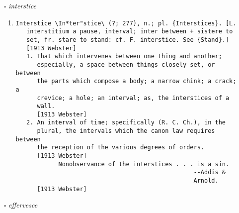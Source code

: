 \documentclass{article}
\begin{document}
\begin{itemize}
\begin{enumerate}
\item{
\begin{lstlisting}
Sardonic \Sar*don"ic\, a.
   Of, pertaining to, or resembling, a kind of linen made at
   Colchis.
   [1913 Webster]
Sardonic \Sar*don"ic\, a. [F. sardonique, L. sardonius, Gr. ?,
   ?, perhaps fr. ? to grin like a dog, or from a certain plant
   of Sardinia, Gr. ?, which was said to screw up the face of
   the eater.]
   Forced; unnatural; insincere; hence, derisive, mocking,
   malignant, or bitterly sarcastic; -- applied only to a laugh,
   smile, or some facial semblance of gayety.
   [1913 Webster]
         Where strained, sardonic smiles are glozing still,
         And grief is forced to laugh against her will. --Sir H.
                                                  Wotton.
   [1913 Webster]
         The scornful, ferocious, sardonic grin of a bloody
         ruffian.                                 --Burke.
   [1913 Webster]
   {Sardonic grin} or {Sardonic laugh}, an old medical term for
      a spasmodic affection of the muscles of the face, giving
      it an appearance of laughter.
      [1913 Webster]
\end{lstlisting}}
\end{enumerate}
\item[$\square$] \emph{ interstice }
\begin{enumerate}
\item{
\begin{lstlisting}
Interstice \In*ter"stice\ (?; 277), n.; pl. {Interstices}. [L.
   interstitium a pause, interval; inter between + sistere to
   set, fr. stare to stand: cf. F. interstice. See {Stand}.]
   [1913 Webster]
   1. That which intervenes between one thing and another;
      especially, a space between things closely set, or between
      the parts which compose a body; a narrow chink; a crack; a
      crevice; a hole; an interval; as, the interstices of a
      wall.
      [1913 Webster]
   2. An interval of time; specifically (R. C. Ch.), in the
      plural, the intervals which the canon law requires between
      the reception of the various degrees of orders.
      [1913 Webster]
            Nonobservance of the interstices . . . is a sin.
                                                  --Addis &
                                                  Arnold.
      [1913 Webster]
\end{lstlisting}}
\end{enumerate}
\item[$\square$] \emph{ effervesce }

\end{itemize}
\end{document}
